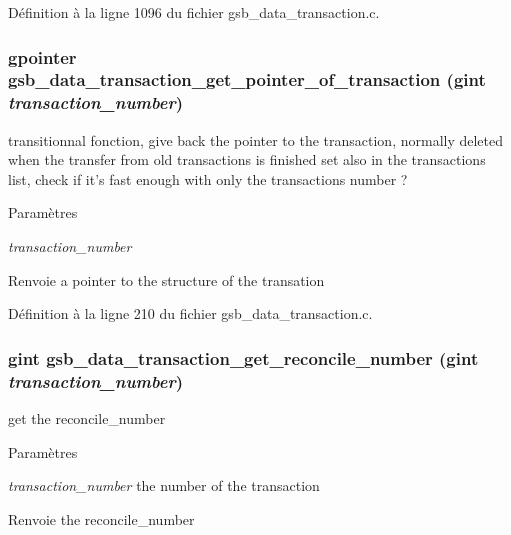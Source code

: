 Définition à la ligne 1096 du fichier gsb\_\-data\_\-transaction.c.

\subsubsection[{gsb\_\-data\_\-transaction\_\-get\_\-pointer\_\-of\_\-transaction}]{\setlength{\rightskip}{0pt plus 5cm}gpointer gsb\_\-data\_\-transaction\_\-get\_\-pointer\_\-of\_\-transaction (gint {\em transaction\_\-number})}\label{gsb__data__transaction_8c_a4d90c43dcc4db054a1e2ec3b9ff45acc}
transitionnal fonction, give back the pointer to the transaction, normally deleted when the transfer from old transactions is finished set also in the transactions list, check if it's fast enough with only the transactions number ?


\begin{DoxyParams}{Paramètres}
\item[{\em transaction\_\-number}]\end{DoxyParams}
\begin{DoxyReturn}{Renvoie}
a pointer to the structure of the transation 
\end{DoxyReturn}


Définition à la ligne 210 du fichier gsb\_\-data\_\-transaction.c.

\subsubsection[{gsb\_\-data\_\-transaction\_\-get\_\-reconcile\_\-number}]{\setlength{\rightskip}{0pt plus 5cm}gint gsb\_\-data\_\-transaction\_\-get\_\-reconcile\_\-number (gint {\em transaction\_\-number})}\label{gsb__data__transaction_8c_a1f902ce2841e41d3eda536f2fdd3c32f}
get the reconcile\_\-number 
\begin{DoxyParams}{Paramètres}
\item[{\em transaction\_\-number}]the number of the transaction \end{DoxyParams}
\begin{DoxyReturn}{Renvoie}
the reconcile\_\-number 
\end{DoxyReturn}


